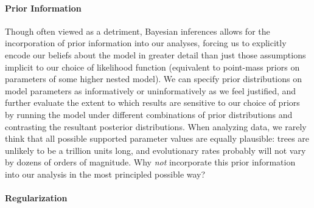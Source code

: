 \paragraph{Prior Information}

Though often viewed as a detriment, Bayesian inferences allows for the incorporation of prior information into our analyses, forcing us to explicitly encode our beliefs about the model in greater detail than just those assumptions implicit to our choice of likelihood function (equivalent to point-mass priors on parameters of some higher nested model). We can specify prior distributions on model parameters as informatively or uninformatively as we feel justified, and further evaluate the extent to which results are sensitive to our choice of priors by running the model under different combinations of prior distributions and contrasting the resultant posterior distributions. When analyzing data, we rarely think that all possible supported parameter values are equally plausible: trees are unlikely to be a trillion units long, and evolutionary rates probably will not vary by dozens of orders of magnitude. Why \textit{not} incorporate this prior information into our analysis in the most principled possible way?

\paragraph{Regularization}

